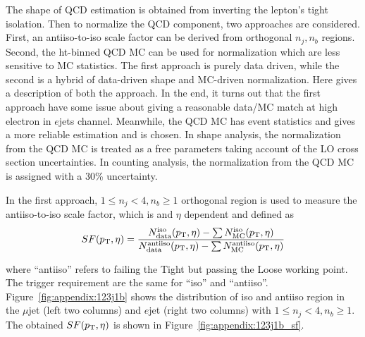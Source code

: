 The shape of QCD estimation is obtained from inverting the lepton's tight isolation. Then to normalize the QCD component, two approaches are considered. First, an antiiso-to-iso 
scale factor can be derived from orthogonal $n_j,n_b$ regions. Second, the ht-binned QCD MC can be used for normalization which are less sensitive to MC statistics. The first approach is purely data driven, while the second is a hybrid of data-driven shape and MC-driven normalization. Here gives a description of both the approach. In the end, it turns out that the first approach have some issue about giving a reasonable data/MC match at high electron \pt in $e$jets channel. Meanwhile, the QCD MC has event statistics and gives a more reliable estimation and is chosen. In shape analysis, the normalization from the QCD MC is treated as a free parameters taking account of the LO cross section uncertainties.
In counting analysis, the normalization from the QCD MC is assigned with a 30\% uncertainty.

In the first approach, $1\leq n_j<4,n_b\geq1$ orthogonal region is used to measure the antiiso-to-iso scale factor, which is \pt and $\eta$ dependent and defined as
\begin{equation}
SF (p_{\mathrm{T}}, \eta) =  \frac{N^{\rm{iso}}_{\rm{data}} (p_{\mathrm{T}}, \eta) - \sum N^{\rm{iso}}_{\rm{MC}}(p_{\mathrm{T}}, \eta) } 
{N^{\rm{antiiso}}_{\rm{data}} (p_{\mathrm{T}}, \eta)- \sum N^{\rm{antiiso}}_{\rm{MC}}(p_{\mathrm{T}}, \eta) }
\end{equation}

\noindent where ``antiiso'' refers to failing the Tight but passing the Loose working point. The trigger requirement are the same for ``iso'' and ``antiiso''. Figure~\ref{fig:appendix:123j1b} shows the distribution of iso and antiiso region in the $\mu$jet (left two columns) and $e$jet (right two columns) with $1\leq n_j<4,n_b\geq1$. The obtained $SF (p_{\mathrm{T}}, \eta)$ is shown in Figure~\ref{fig:appendix:123j1b_sf}.

